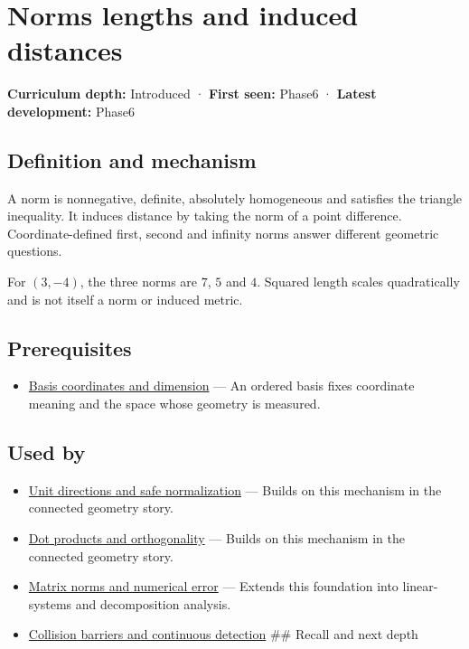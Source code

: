 \hypertarget{appendix-49933872bb51}{}\label{referencestart:appendix-49933872bb51}
\section{Norms lengths and induced distances}\label{appendix-49933872bb51-norms-lengths-and-induced-distances}

\textbf{Curriculum depth:} Introduced · \textbf{First seen:} Phase6 · \textbf{Latest development:} Phase6

\subsection{Definition and mechanism}\label{appendix-49933872bb51-definition-and-mechanism}

A norm is nonnegative, definite, absolutely homogeneous and satisfies the triangle inequality. It induces distance by taking the norm of a point difference. Coordinate-defined first, second and infinity norms answer different geometric questions.

For \((3,-4)\), the three norms are \(7\), \(5\) and \(4\). Squared length scales quadratically and is not itself a norm or induced metric.

\subsection{Prerequisites}\label{appendix-49933872bb51-prerequisites}

\begin{itemize}
\tightlist
\item
  \hyperref[appendix-ce0341f7ea0d]{Basis coordinates and dimension} --- An ordered basis fixes coordinate meaning and the space whose geometry is measured.
\end{itemize}

\subsection{Used by}\label{appendix-49933872bb51-used-by}

\begin{itemize}
\item
  \hyperref[appendix-f744e41b95b4]{Unit directions and safe normalization} --- Builds on this mechanism in the connected geometry story.
\item
  \hyperref[appendix-8bc4e8fc547c]{Dot products and orthogonality} --- Builds on this mechanism in the connected geometry story.
\item
  \hyperref[appendix-f8657bac66e5]{Matrix norms and numerical error} --- Extends this foundation into linear-systems and decomposition analysis.
\item
  \hyperref[appendix-a9ba01fa72a6]{Collision barriers and continuous detection} \#\# Recall and next depth
\end{itemize}

